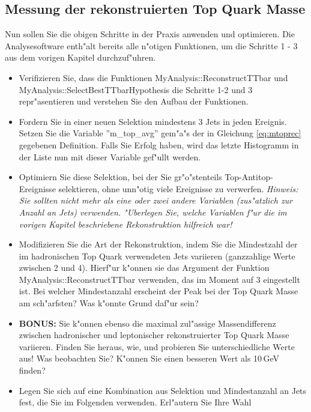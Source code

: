 \subsection{Messung der rekonstruierten Top Quark Masse}
Nun sollen Sie die obigen Schritte in der Praxis anwenden und optimieren. Die Analysesoftware enth"alt bereits alle n"otigen Funktionen, um die Schritte 1 - 3 aus dem vorigen Kapitel durchzuf"uhren. 

\begin{itemize}
\item Verifizieren Sie, dass die Funktionen MyAnalysis::ReconstructTTbar und MyAnalysis::SelectBestTTbarHypothesis die Schritte 1-2 und 3 repr"asentieren und verstehen Sie den Aufbau der Funktionen. 

\item Fordern Sie in einer neuen Selektion mindestens 3 Jets in jeden Ereignis. Setzen Sie die Variable ''m\_top\_avg'' gem"a"s der in Gleichung \ref{eq:mtoprec} gegebenen Definition. Falls Sie Erfolg haben, wird das letzte Histogramm in der Liste nun mit dieser Variable gef"ullt werden.

\item Optimiern Sie diese Selektion, bei der Sie gr"o"stenteils Top-Antitop-Ereignisse selektieren, ohne unn"otig viele Ereignisse zu verwerfen. \textit{Hinweis: Sie sollten nicht mehr als eine oder zwei andere Variablen (zus"atzlich zur Anzahl an Jets) verwenden. "Uberlegen Sie, welche Variablen f"ur die im vorigen Kapitel beschriebene Rekonstruktion hilfreich war!}

\item Modifizieren Sie die Art der Rekonstruktion, indem Sie die Mindestzahl der im hadronischen Top Quark verwendeten Jets variieren (ganzzahlige Werte zwischen 2 und 4). Hierf"ur k"onnen sie das Argument der Funktion MyAnalysis::ReconstructTTbar verwenden, das im Moment auf 3 eingestellt ist. Bei welcher Mindestanzahl erscheint der Peak bei der Top Quark Masse am sch"arfsten? Was k"onnte Grund daf"ur sein?

\item \textbf{BONUS:} Sie k"onnen ebenso die maximal zul"assige Massendifferenz zwischen hadronischer und leptonischer rekonstruierter Top Quark Masse variieren. Finden Sie heraus, wie, und probieren Sie unterschiedliche Werte aus! Was beobachten Sie? K"onnen Sie einen besseren Wert als 10\,GeV finden?

\item Legen Sie sich auf eine Kombination aus Selektion und Mindestanzahl an Jets fest, die Sie im Folgenden verwenden. Erl"autern Sie Ihre Wahl

\end{itemize}

